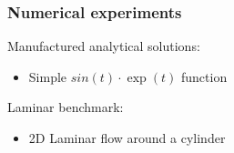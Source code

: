 \begin{frame}[t]
\frametitle{Numerical experiments}
\vfill
Manufactured analytical solutions:
\begin{itemize}
\item Simple $ sin(t)\cdot\exp(t) $ function
\end{itemize}
\vspace{1cm}
Laminar benchmark:
\begin{itemize}
\item 2D Laminar flow around a cylinder
\end{itemize}
\vfill
\end{frame}